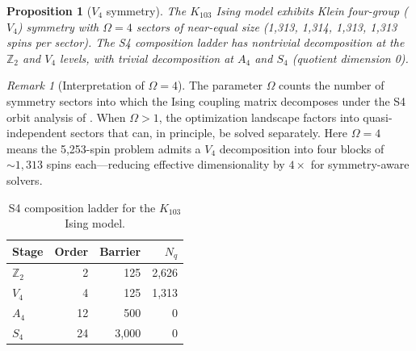 \documentclass[11pt,a4paper]{article}
\theoremstyle{plain}
\newtheorem{proposition}[theorem]{Proposition}
\theoremstyle{remark}
\newtheorem{remark}[theorem]{Remark}
\newcommand{\Z}{\mathbb{Z}}
\begin{document}
\begin{proposition}[$V_4$ symmetry]\label{prop:v4}
The $K_{103}$ Ising model exhibits Klein four-group ($V_4$)
symmetry with $\Omega = 4$ sectors of near-equal size
(1{,}313, 1{,}314, 1{,}313, 1{,}313 spins per sector).
The S4 composition ladder has nontrivial decomposition at the
$\Z_2$ and $V_4$ levels, with trivial decomposition at $A_4$ and
$S_4$ (quotient dimension 0).
\end{proposition}

\begin{remark}[Interpretation of $\Omega = 4$]
The parameter $\Omega$ counts the number of symmetry sectors into
which the Ising coupling matrix decomposes under the S4 orbit
analysis of \cite{daugherty2026ramsey}. When $\Omega > 1$, the
optimization landscape factors into quasi-independent sectors that
can, in principle, be solved separately. Here $\Omega = 4$ means
the 5{,}253-spin problem admits a $V_4$ decomposition into four
blocks of ${\sim}1{,}313$ spins each---reducing effective
dimensionality by $4\times$ for symmetry-aware solvers.
\end{remark}

\begin{table}[H]
\centering
\caption{S4 composition ladder for the $K_{103}$ Ising model.}
\label{tab:s4}
\small
\begin{tabular}{@{}lrrr@{}}
\toprule
\textbf{Stage} & \textbf{Order} & \textbf{Barrier} & \textbf{$N_q$} \\
\midrule
$\Z_2$ & 2 & 125 & 2{,}626 \\
$V_4$ & 4 & 125 & 1{,}313 \\
$A_4$ & 12 & 500 & 0 \\
$S_4$ & 24 & 3{,}000 & 0 \\
\bottomrule
\end{tabular}
\end{table}
\end{document}
